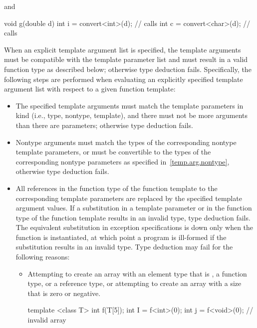 and

\begin{codeblock}
void g(double d)
{
	int i = convert<int>(d);	// calls 
	int c = convert<char>(d);	// calls 
}
\end{codeblock}
\exitexampleb

\pnum
When an explicit template argument list is specified, the template
arguments must be compatible with the template parameter list and must
result in a valid function type as described below; otherwise type
deduction fails.  Specifically, the following steps are performed when
evaluating an explicitly specified template argument list with respect
to a given function template:

\begin{itemize}
\item The specified template arguments must match the template parameters in
kind (i.e., type, nontype, template), and there must not be more arguments
than there are parameters; otherwise type deduction fails.

\item Nontype arguments must match the types of the corresponding nontype
template parameters, or must be convertible to the types of the
corresponding nontype parameters as specified in~\ref{temp.arg.nontype}, otherwise type deduction fails.

\item All references in the function type of the function template to the
corresponding template parameters are replaced by the specified template
argument values. If a substitution in a template parameter or in the
function type of the function template results in an invalid type, type
deduction fails.
\enternote The equivalent substitution in exception specifications is down
only when the function is instantiated, at which point a program is ill-formed
if the substitution results in an invalid type.\exitnote
Type deduction may fail for the following reasons:

\begin{itemize}
\item Attempting to create an array with an element type that is ,
a function type, or a reference type, or attempting to create an array with
a size that is zero or negative.
\enterexample
\begin{codeblock}
template <class T> int f(T[5]);
int I = f<int>(0);
int j = f<void>(0);		// invalid array
\end{codeblock}
\exitexample


\end{itemize}
\end{itemize}
